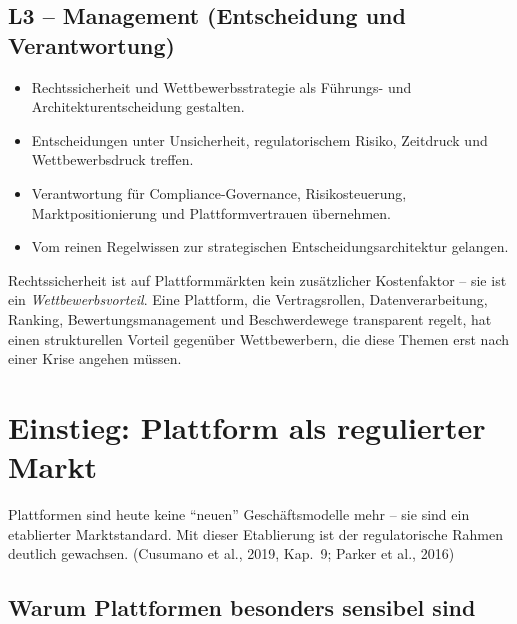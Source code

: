 \documentclass[11pt,a4paper,oneside]{article}
\newcommand{\quelle}[1]{{\footnotesize\color{lpGray}(#1)}}
\begin{document}
\subsection*{L3 -- Management (Entscheidung und Verantwortung)}
\begin{itemize}
  \item Rechtssicherheit und Wettbewerbsstrategie als Führungs- und Architekturentscheidung gestalten.
  \item Entscheidungen unter Unsicherheit, regulatorischem Risiko, Zeitdruck und Wettbewerbsdruck treffen.
  \item Verantwortung für Compliance-Governance, Risikosteuerung, Marktpositionierung und Plattformvertrauen übernehmen.
  \item Vom reinen Regelwissen zur strategischen Entscheidungsarchitektur gelangen.
\end{itemize}

\begin{merkbox}
Rechtssicherheit ist auf Plattformmärkten kein zusätzlicher Kostenfaktor -- sie ist ein \emph{Wettbewerbsvorteil}. Eine Plattform, die Vertragsrollen, Datenverarbeitung, Ranking, Bewertungsmanagement und Beschwerdewege transparent regelt, hat einen strukturellen Vorteil gegenüber Wettbewerbern, die diese Themen erst nach einer Krise angehen müssen.
\end{merkbox}

\clearpage

\section{Einstieg: Plattform als regulierter Markt}

Plattformen sind heute keine ``neuen'' Geschäftsmodelle mehr -- sie sind ein etablierter Marktstandard. Mit dieser Etablierung ist der regulatorische Rahmen deutlich gewachsen. \quelle{Cusumano et al., 2019, Kap.~9; Parker et al., 2016}

\subsection{Warum Plattformen besonders sensibel sind}
\end{document}
